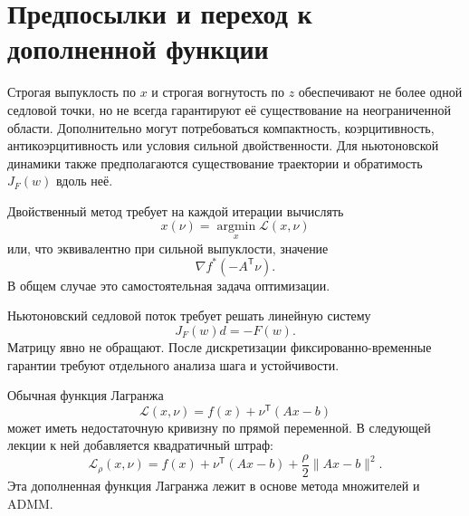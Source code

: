\section{Предпосылки и переход к дополненной функции}

Строгая выпуклость по \(x\) и строгая вогнутость по \(z\)
обеспечивают не более одной седловой точки, но не всегда гарантируют
её существование на неограниченной области. Дополнительно могут
потребоваться компактность, коэрцитивность, антикоэрцитивность или
условия сильной двойственности. Для ньютоновской динамики также
предполагаются существование траектории и обратимость \(J_F(w)\)
вдоль неё.

Двойственный метод требует на каждой итерации вычислять
\[
    x(\nu)
    =
    \operatorname*{argmin}_x
    \mathcal L(x,\nu)
\]
или, что эквивалентно при сильной выпуклости, значение
\[
    \nabla f^\ast(-A^{\mathsf T}\nu).
\]
В общем случае это самостоятельная задача оптимизации.

Ньютоновский седловой поток требует решать линейную систему
\[
    J_F(w)d=-F(w).
\]
Матрицу явно не обращают. После дискретизации фиксированно-временные
гарантии требуют отдельного анализа шага и устойчивости.

Обычная функция Лагранжа
\[
    \mathcal L(x,\nu)
    =
    f(x)+\nu^{\mathsf T}(Ax-b)
\]
может иметь недостаточную кривизну по прямой переменной. В следующей
лекции к ней добавляется квадратичный штраф:
\[
    \mathcal L_\rho(x,\nu)
    =
    f(x)
    +
    \nu^{\mathsf T}(Ax-b)
    +
    \frac\rho2
    \lVert Ax-b\rVert^2.
\]
Эта дополненная функция Лагранжа лежит в основе метода множителей и
ADMM.
